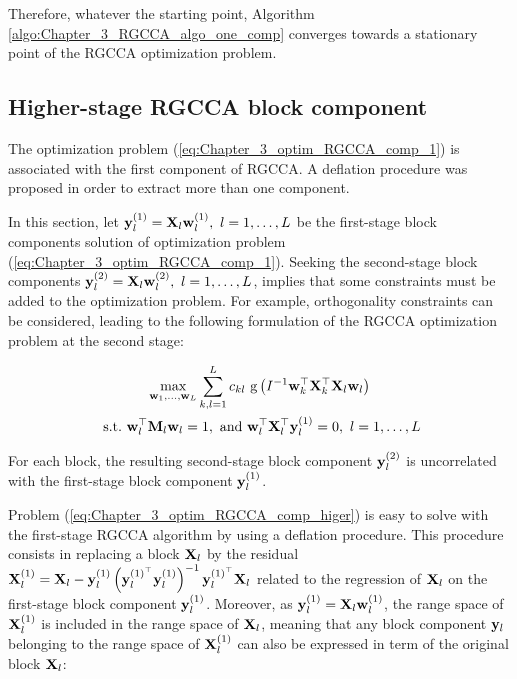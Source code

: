 \documentclass[
]{jss}
\begin{document}
Therefore, whatever the starting point, Algorithm
\ref{algo:Chapter_3_RGCCA_algo_one_comp} converges towards a stationary
point of the RGCCA optimization problem.

\hypertarget{higher-stage-rgcca-block-component}{%
\subsection{Higher-stage RGCCA block
component}\label{higher-stage-rgcca-block-component}}

The optimization problem (\ref{eq:Chapter_3_optim_RGCCA_comp_1}) is
associated with the first component of RGCCA. A deflation procedure was
proposed in order to extract more than one component.

In this section, let \(\mathbf{y}_l^{(1)} = \mathbf{X}_l\mathbf{w}_l^{(1)}, ~ l = 1, \ldots, L\)
be the first-stage block components solution of optimization problem
(\ref{eq:Chapter_3_optim_RGCCA_comp_1}). Seeking the second-stage block
components \(\mathbf{y}_l^{(2)} = \mathbf{X}_l\mathbf{w}_l^{(2)}, ~ l = 1, \ldots, L\), implies
that some constraints must be added to the optimization problem. For
example, orthogonality constraints can be considered, leading to the
following formulation of the RGCCA optimization problem at the second
stage:

\begin{equation}
    \begin{gathered}
        \underset{\mathbf{w}_1, \ldots,\mathbf{w}_L}{\text{max}} \sum_{\substack{k, l = 1}}^L c_{kl} \text{ g}\left(I^{-1}\mathbf{w}_k^\top \mathbf{X}_k ^\top \mathbf{X}_l \mathbf{w}_l \right)
        \\
        \text{~s.t.~} \mathbf{w}_l^\top\mathbf{M}_l\mathbf{w}_l = 1,~\text{and}~\mathbf{w}_l^\top\mathbf{X}_l^\top\mathbf{y}_l^{(1)} = 0, ~l = 1, \ldots, L
    \label{eq:Chapter_3_optim_RGCCA_comp_higer}
    \end{gathered}
\end{equation}

For each block, the resulting second-stage block component
\(\mathbf{y}_l^{(2)}\) is uncorrelated with the first-stage block component
\(\mathbf{y}_l^{(1)}\).

Problem (\ref{eq:Chapter_3_optim_RGCCA_comp_higer}) is easy to solve
with the first-stage RGCCA algorithm by using a deflation procedure.
This procedure consists in replacing a block \(\mathbf{X}_l\) by the residual
\(\mathbf{X}_l^{(1)} = \mathbf{X}_l - \mathbf{y}_l^{(1)} \left( \mathbf{y}_l^{(1)^\top} \mathbf{y}_l^{(1)} \right)^{-1}\mathbf{y}_l^{(1)^\top}\mathbf{X}_l\)
related to the regression of \(\mathbf{X}_l\) on the first-stage block component
\(\mathbf{y}_l^{(1)}\). Moreover, as \(\mathbf{y}_l^{(1)} = \mathbf{X}_l\mathbf{w}_l^{(1)}\), the range
space of \(\mathbf{X}_l^{(1)}\) is included in the range space of \(\mathbf{X}_l\),
meaning that any block component \(\mathbf{y}_l\) belonging to the range space
of \(\mathbf{X}_l^{(1)}\) can also be expressed in term of the original block
\(\mathbf{X}_l\):
\end{document}
